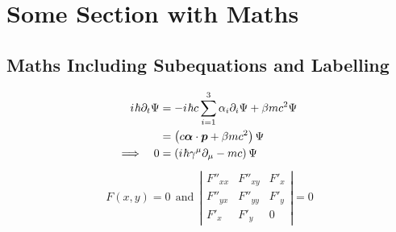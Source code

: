 
\chapter{Some Section with Maths}
\blindmathpaper


\section{Maths Including Subequations and Labelling}
\label{sec:maths-incl-subeq}
\blindtext
\newcommand{\iu}{{i\mkern1mu}}
\vspace{-.4cm}
\begin{subequations}
  \begin{align}
    \iu \hbar \partial_t \Psi &= - \iu \hbar c \sum_{i=1}^3 \alpha_i \partial_i \Psi + \beta m c^2 \Psi\\ &= \left( c \vec \alpha \cdot \vec p + \beta m c^2 \right) \Psi \\
    \Longrightarrow \quad 0 &= \left( \iu \hbar \gamma^\mu \partial_\mu - mc \right) \Psi
  \end{align}
\end{subequations}
\blindtext
\begin{align}
  F(x,y)=0 ~~\mbox{and}~~
  \left| \begin{array}{ccc}
           F''_{xx} & F''_{xy} &  F'_x \\
           F''_{yx} & F''_{yy} &  F'_y \\
           F'_x     & F'_y     & 0
         \end{array}\right| = 0
\label{eq:1}
\end{align}
\blindtext



